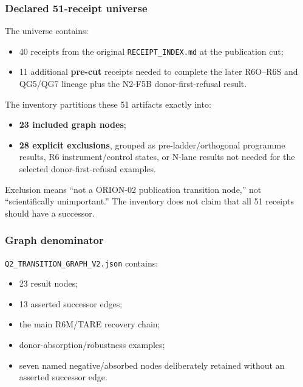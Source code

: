\documentclass[preprint,12pt]{elsarticle}
\providecommand{\tightlist}{%
  \setlength{\itemsep}{0pt}\setlength{\parskip}{0pt}}
\begin{document}
\hypertarget{declared-51-receipt-universe}{%
\subsubsection{Declared 51-receipt
universe}\label{declared-51-receipt-universe}}

The universe contains:

\begin{itemize}
\tightlist
\item
  40 receipts from the original \texttt{RECEIPT\_INDEX.md} at the
  publication cut;
\item
  11 additional \textbf{pre-cut} receipts needed to complete the later
  R6O--R6S and QG5/QG7 lineage plus the N2-F5B donor-first-refusal
  result.
\end{itemize}

The inventory partitions these 51 artifacts exactly into:

\begin{itemize}
\tightlist
\item
  \textbf{23 included graph nodes};
\item
  \textbf{28 explicit exclusions}, grouped as pre-ladder/orthogonal
  programme results, R6 instrument/control states, or N-lane results not
  needed for the selected donor-first-refusal examples.
\end{itemize}

Exclusion means ``not a ORION-02 publication transition node,'' not
``scientifically unimportant.'' The inventory does not claim that all 51
receipts should have a successor.

\hypertarget{graph-denominator}{%
\subsubsection{Graph denominator}\label{graph-denominator}}

\texttt{Q2\_TRANSITION\_GRAPH\_V2.json} contains:

\begin{itemize}
\tightlist
\item
  23 result nodes;
\item
  13 asserted successor edges;
\item
  the main R6M/TARE recovery chain;
\item
  donor-absorption/robustness examples;
\item
  seven named negative/absorbed nodes deliberately retained without an
  asserted successor edge.
\end{itemize}
\end{document}

